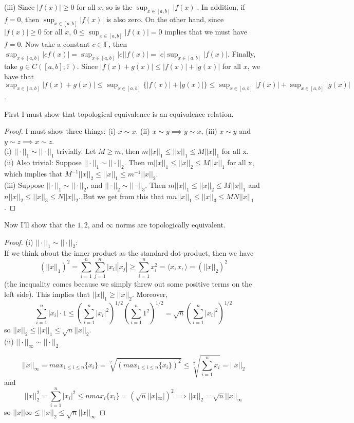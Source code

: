 \documentclass[12pt]{article}
\newenvironment{problem}[2][Problem]{\begin{trivlist}
\item[\hskip \labelsep {\bfseries #1}\hskip \labelsep {\bfseries #2.}]}{\end{trivlist}}
\theoremstyle{definition}
\theoremstyle{definition}
\theoremstyle{definition}
\theoremstyle{definition}
\begin{document}
(iii)
Since $|f(x)|\geq 0$ for all $x$, so is the $\sup_{x\in[a, b]}|f(x)|$.
In addition, if $f=0$, then $\sup_{x\in[a, b]}|f(x)|$ is also zero.
On the other hand, since $|f(x)|\geq 0$ for all $x$, $0\leq\sup_{x\in[a, b]}|f(x)|=0$
implies that we must have $f=0$.
Now take a constant $c\in\mathbb F$, then
$\sup_{x\in[a, b]}|cf(x)|=\sup_{x\in[a, b]}|c||f(x)|=|c|\sup_{x\in[a, b]}|f(x)|$.
Finally, take $g\in C([a, b];\mathbb F)$.
Since $|f(x)+g(x)|\leq|f(x)|+|g(x)|$ for all $x$, we have that
$\sup_{x\in[a, b]}|f(x)+g(x)|\leq\sup_{x\in[a, b]}\{|f(x)|+|g(x)|\}
\leq\sup_{x\in[a, b]}|f(x)|+\sup_{x\in[a, b]}|g(x)|$.


\begin{problem}{3.26} 
First I must show that topological equivalence is an equivalence relation.
\begin{proof}
I must show three things: (i) $x \sim x$. (ii) $x \sim y  \implies y \sim x$, (iii) $x \sim y$ and $y \sim z \implies x \sim z$. \\
(i) $ || \cdot ||_1 \sim || \cdot ||_1 $ trivially. Let $M \geq m$, then $m||x||_1 \leq || x ||_1 \leq M|| x ||_1$ for all x. \\
(ii) Also trivial: Suppose $|| \cdot ||_1 \sim || \cdot ||_2$. Then $m||x||_1 \leq || x ||_2 \leq M|| x ||_1$ for all x, which implies that $M^{-1}||x||_2 \leq ||x||_1 \leq m^{-1}||x||_2$. \\
(iii) Suppose $|| \cdot ||_1 \sim || \cdot ||_2 $, and $|| \cdot ||_2 \sim || \cdot ||_3$. Then $m||x||_1 \leq || x ||_2 \leq M|| x ||_1$ and $n||x||_2 \leq || x ||_3 \leq N|| x ||_2$. But we get from this that $mn||x||_1 \leq ||x||_3 \leq MN||x||_1$.
\end{proof}
Now I'll show that the $1, 2$, and $ \infty$ norms are topologically equivalent. 
\begin{proof}
(i) $|| \cdot ||_1 \sim || \cdot ||_2$: \\
If we think about the inner product as the standard dot-product, then we have $$(||x||_1)^2 = \sum_{i=1}^n \sum_{j=1}^n |x_i||x_j| \geq \sum_{i=1}^n x_i^2 = \langle x, x, \rangle = (||x||_2)^2$$ 
(the inequality comes because we simply threw out some positive terms on the left side). This implies that $||x||_1 \geq ||x||_2$. Moreover, 
$$
\sum_{i=1}^n|x_i|\cdot1\leq
\left(\sum_{i=1}^n|x_i|^2\right)^{1/2}\left(\sum_{i=1}^n1^2\right)^{1/2}=
\sqrt{n}\left(\sum_{i=1}^n|x_i|^2\right)^{1/2}
$$
so $||x||_2\leq ||x||_1 \leq \sqrt{n}||x||_2$. \\
(ii) $|| \cdot ||_\infty \sim || \cdot ||_2$

$$
||x||_\infty = max_{1 \leq i \leq n}\{ x_i \} = \sqrt[2]{(max_{1 \leq i \leq n} \{ x_i \})^2} \leq \sqrt[2]{\sum_{i=1}^n x_i} = ||x||_2
$$
and 
$$
||x||_2^2 = \sum_{i=1}^n |x_i|^2 \leq n max_i \{ x_i \} = (\sqrt{n}||x|_\infty|)^2 \implies ||x||_2 = \sqrt{n}||x||_\infty
$$
so $||x||\infty \leq ||x||_2 \leq \sqrt{n}||x||_\infty$
\end{proof}
\end{problem}
\end{document}
